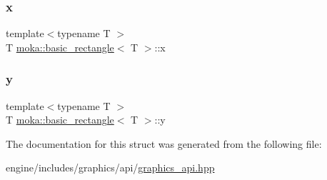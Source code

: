 \mbox{\label{structmoka_1_1basic__rectangle_a8221be0d993b1022e581a8c68df1bfb3}} 
\subsubsection{\texorpdfstring{x}{x}}
{\footnotesize\ttfamily template$<$typename T $>$ \\
T \mbox{\hyperlink{structmoka_1_1basic__rectangle}{moka\+::basic\+\_\+rectangle}}$<$ T $>$\+::x}

\mbox{\label{structmoka_1_1basic__rectangle_a5023ee863e872b98eb7e54bcabba857a}} 
\subsubsection{\texorpdfstring{y}{y}}
{\footnotesize\ttfamily template$<$typename T $>$ \\
T \mbox{\hyperlink{structmoka_1_1basic__rectangle}{moka\+::basic\+\_\+rectangle}}$<$ T $>$\+::y}



The documentation for this struct was generated from the following file\+:\begin{DoxyCompactItemize}
\item 
engine/includes/graphics/api/\mbox{\hyperlink{graphics__api_8hpp}{graphics\+\_\+api.\+hpp}}\end{DoxyCompactItemize}

